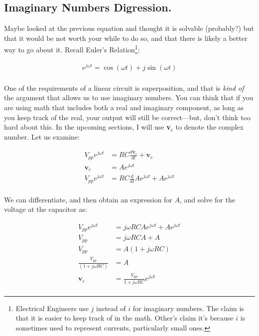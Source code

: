 \documentclass[12pt]{report}
\newcommand{\pr}[1]{\left(#1\right)}
\newcommand{\Vpp}{{ V}_{ pp}}
\begin{document}
\subsection{Imaginary Numbers Digression.}
Maybe looked at the previous equation and thought it is solvable (probably?) but that it would be not worth your while to do so, and that there is likely a better way to go about it. Recall Euler's Relation\footnote{Electrical Engineers use $j$ instead of $i$ for imaginary numbers. The claim is that it is easier to keep track of in the math. Other's claim it's because $i$ is sometimes used to represent currents, particularly small ones.}: 

\begin{equation} \label{imag1}
\begin{split}
e^{j\omega t} = \cos(\omega t) + j\sin(\omega t) \\
\end{split}
\end{equation}

One of the requirements of a linear circuit is superposition, and that is \textit{kind of} the argument that allows us to use imaginary numbers. You can think that if you are using math that includes both a real and imaginary component, as long as you keep track of the real, your output will still be correct---but, don't think too hard about this. In the upcoming sections, I will use \textbf{v}$_c$ to denote the complex number. Let us examine: 

\begin{equation} \label{imag2}
\begin{split}
\Vpp e^{j\omega t} &= RC\frac{d\textbf{v}_c}{dt} + \textbf{v}_c \\
\textbf{v}_c &= Ae^{j\omega t} \\
\Vpp e^{j\omega t} &= RC\frac{d}{dt}Ae^{j\omega t} + Ae^{j\omega t} \\
\end{split}
\end{equation}

We can differentiate, and then obtain an expression for $A$, and solve for the voltage at the capacitor as:

\begin{equation} \label{imag3}
\begin{split}
\Vpp e^{j\omega t} &= j\omega RCAe^{j\omega t} + Ae^{j\omega t} \\
\Vpp &= j\omega RCA + A \\
\Vpp &= A\pr{1 + j\omega RC}\\
\frac{\Vpp}{\pr{1 + j\omega RC}} &= A\\
\textbf{v}_c &= \frac{\Vpp}{1 + j\omega RC}e^{j\omega t} \\
\end{split}
\end{equation}
\end{document}
